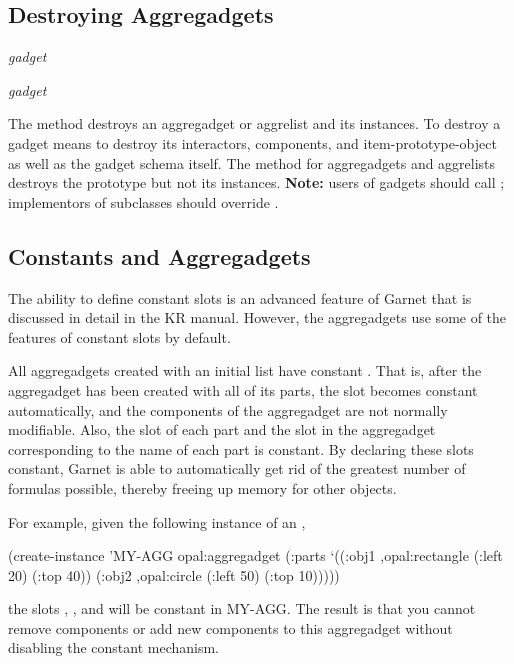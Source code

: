 \begin{group}
\subsection{Destroying Aggregadgets}

 {\it gadget}\value{method}

 {\it gadget}\value{method}

The  method destroys an aggregadget or aggrelist
and its instances.
To destroy a gadget means to destroy its interactors, components,
and item-prototype-object as well as the gadget schema itself.
The  method for
aggregadgets and aggrelists destroys the prototype but not its
instances.  {\bf Note:} users of gadgets should call ;
implementors of subclasses should override .
\end{group}


\subsection{Constants and Aggregadgets}
\label{constants-and-aggregadgets}
The ability to define constant slots is an advanced feature of Garnet that is
discussed in detail in the KR manual.  However, the aggregadgets use
some of the features of constant slots by default.

All aggregadgets created with an initial  list have
constant .  That is, after the aggregadget has
been created with all of its parts, the  slot becomes
constant automatically, and the components of the aggregadget are
not normally modifiable.  Also, the  slot of each part
and the slot in the aggregadget corresponding to the name of each
part is constant.  By declaring these slots constant, Garnet is able
to automatically get rid of the greatest number of formulas possible,
thereby freeing up memory for other objects.

For example, given the following instance of an ,
\begin{programexample}
(create-instance 'MY-AGG opal:aggregadget
  (:parts
   `((:obj1 ,opal:rectangle
            (:left 20) (:top 40))
     (:obj2 ,opal:circle
            (:left 50) (:top 10)))))
\end{programexample}
the slots , , and  will be
constant in MY-AGG.  The result is that you cannot remove components
or add new components to this aggregadget without disabling the
constant mechanism.

